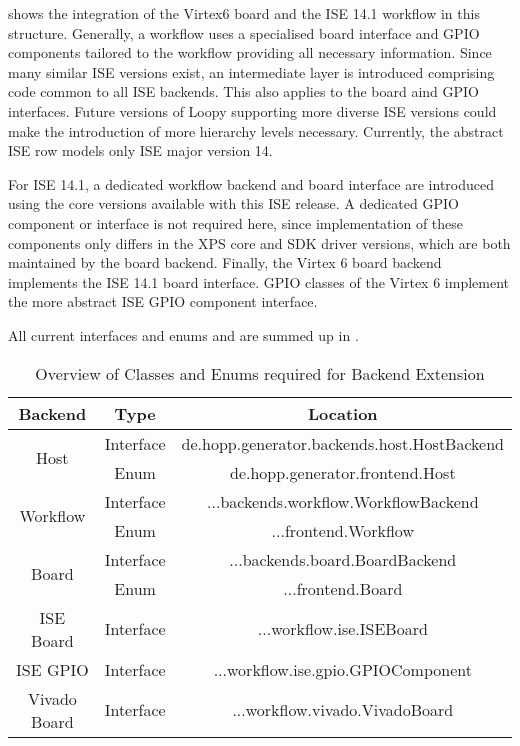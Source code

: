 \documentclass{report}
\begin{document}
 shows the integration of the Virtex6 board and the ISE 14.1 workflow in this structure. Generally, a workflow uses a specialised board interface and GPIO components tailored to the workflow providing all necessary information. Since many similar ISE versions exist, an intermediate layer is introduced comprising code common to all ISE backends. This also applies to the board aind GPIO interfaces. Future versions of Loopy supporting more diverse ISE versions could make the introduction of more hierarchy levels necessary. Currently, the abstract ISE row models only ISE major version 14.

For ISE 14.1, a dedicated workflow backend and board interface are introduced using the core versions available with this ISE release. A dedicated GPIO component or interface is not required here, since implementation of these components only differs in the XPS core and SDK driver versions, which are both maintained by the board backend. Finally, the Virtex 6 board backend implements the ISE 14.1 board interface. GPIO classes of the Virtex 6 implement the more abstract ISE GPIO component interface.

All current interfaces and enums and are summed up in .

\begin{table}[h]
\centering
\begin{tabular}{ c | c | c }
Backend & Type & Location \\ \hline\hline
\multirow{2}{*}{Host} & Interface & de.hopp.generator.backends.host.HostBackend \\
& Enum & de.hopp.generator.frontend.Host\\ \hline
\multirow{2}{*}{Workflow} & Interface & ...backends.workflow.WorkflowBackend\\
& Enum & ...frontend.Workflow\\ \hline
\multirow{2}{*}{Board} & Interface & ...backends.board.BoardBackend\\
& Enum & ...frontend.Board\\ \hline
ISE Board & Interface & ...workflow.ise.ISEBoard\\
ISE GPIO & Interface & ...workflow.ise.gpio.GPIOComponent\\ \hline
Vivado Board & Interface & ...workflow.vivado.VivadoBoard \\
\end{tabular}
\caption{Overview of Classes and Enums required for Backend Extension}
\label{tab:gen:hook}
\end{table}
\end{document}
